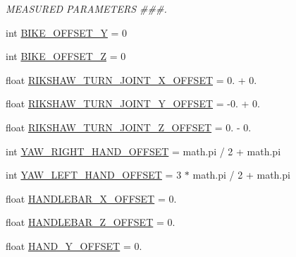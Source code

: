 \begin{DoxyCompactItemize}
\begin{DoxyCompactList}\small\item\em M\+E\+A\+S\+U\+R\+ED P\+A\+R\+A\+M\+E\+T\+E\+RS \#\#\#. \end{DoxyCompactList}\item 
int \mbox{\hyperlink{namespacemultiple__steering__trajectories_a183e79585a92620ede8bc077683f2878}{B\+I\+K\+E\+\_\+\+O\+F\+F\+S\+E\+T\+\_\+Y}} = 0
\item 
int \mbox{\hyperlink{namespacemultiple__steering__trajectories_aa9751b8328b54a71cf522479600f2e5d}{B\+I\+K\+E\+\_\+\+O\+F\+F\+S\+E\+T\+\_\+Z}} = 0
\item 
float \mbox{\hyperlink{namespacemultiple__steering__trajectories_a3c05cd50af3f2b16f72888ec3fc7bd07}{R\+I\+K\+S\+H\+A\+W\+\_\+\+T\+U\+R\+N\+\_\+\+J\+O\+I\+N\+T\+\_\+\+X\+\_\+\+O\+F\+F\+S\+ET}} = 0. + 0.
\item 
float \mbox{\hyperlink{namespacemultiple__steering__trajectories_afce21d4b48b916fe117908a104df73f2}{R\+I\+K\+S\+H\+A\+W\+\_\+\+T\+U\+R\+N\+\_\+\+J\+O\+I\+N\+T\+\_\+\+Y\+\_\+\+O\+F\+F\+S\+ET}} = -\/0. + 0.
\item 
float \mbox{\hyperlink{namespacemultiple__steering__trajectories_a5b00bdf8196e0faad5a04c35a884db0f}{R\+I\+K\+S\+H\+A\+W\+\_\+\+T\+U\+R\+N\+\_\+\+J\+O\+I\+N\+T\+\_\+\+Z\+\_\+\+O\+F\+F\+S\+ET}} = 0. -\/ 0.
\item 
int \mbox{\hyperlink{namespacemultiple__steering__trajectories_a26009b49e45ce0fd1bf29ee1c006e370}{Y\+A\+W\+\_\+\+R\+I\+G\+H\+T\+\_\+\+H\+A\+N\+D\+\_\+\+O\+F\+F\+S\+ET}} = math.\+pi / 2 + math.\+pi
\item 
int \mbox{\hyperlink{namespacemultiple__steering__trajectories_a36deabc947bf0d7b86a777446fcf77eb}{Y\+A\+W\+\_\+\+L\+E\+F\+T\+\_\+\+H\+A\+N\+D\+\_\+\+O\+F\+F\+S\+ET}} = 3 $\ast$ math.\+pi / 2 + math.\+pi
\item 
float \mbox{\hyperlink{namespacemultiple__steering__trajectories_a1253c48cdcf376e78664f22768f1b033}{H\+A\+N\+D\+L\+E\+B\+A\+R\+\_\+\+X\+\_\+\+O\+F\+F\+S\+ET}} = 0.
\item 
float \mbox{\hyperlink{namespacemultiple__steering__trajectories_ad0badcd6c1c7fbbe03b5fc07930bab12}{H\+A\+N\+D\+L\+E\+B\+A\+R\+\_\+\+Z\+\_\+\+O\+F\+F\+S\+ET}} = 0.
\item 
float \mbox{\hyperlink{namespacemultiple__steering__trajectories_ac8cbb583bcba6a11d896abbc9dc0ec45}{H\+A\+N\+D\+\_\+\+Y\+\_\+\+O\+F\+F\+S\+ET}} = 0.

\end{DoxyCompactItemize}
